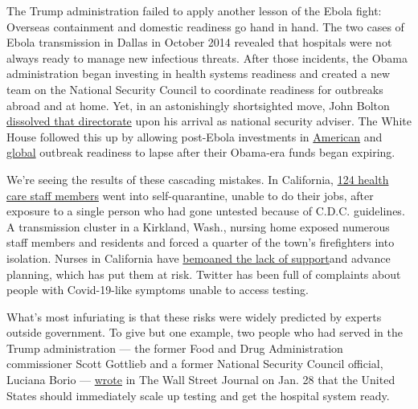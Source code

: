 The Trump administration failed to apply another lesson of the Ebola
fight: Overseas containment and domestic readiness go hand in hand. The
two cases of Ebola transmission in Dallas in October 2014 revealed that
hospitals were not always ready to manage new infectious threats. After
those incidents, the Obama administration began investing in health
systems readiness and created a new team on the National Security
Council to coordinate readiness for outbreaks abroad and at home. Yet,
in an astonishingly shortsighted move, John Bolton
\href{https://www.washingtonpost.com/news/to-your-health/wp/2018/05/10/top-white-house-official-in-charge-of-pandemic-response-exits-abruptly/}{dissolved
that directorate} upon his arrival as national security adviser. The
White House followed this up by allowing post-Ebola investments in
\href{https://www.washingtonpost.com/opinions/a-program-protecting-us-from-deadly-pandemic-is-about-to-expire/2019/12/27/7c216c26-2280-11ea-bed5-880264cc91a9_story.html}{American}
and
\href{https://www.washingtonpost.com/news/to-your-health/wp/2018/02/01/cdc-to-cut-by-80-percent-efforts-to-prevent-global-disease-outbreak/}{global}
outbreak readiness to lapse after their Obama-era funds began expiring.

We're seeing the results of these cascading mistakes. In California,
\href{https://www.cnn.com/2020/02/29/health/uc-davis-health-care-workers-self-quarantine/index.html}{124
health care staff members} went into self-quarantine, unable to do their
jobs, after exposure to a single person who had gone untested because of
C.D.C. guidelines. A transmission cluster in a Kirkland, Wash., nursing
home exposed numerous staff members and residents and forced a quarter
of the town's firefighters into isolation. Nurses in California have
\href{https://www.nytimes3xbfgragh.onion/2020/03/05/us/coronavirus-nurses.html}{bemoaned
the lack of support}and advance planning, which has put them at risk.
Twitter has been full of complaints about people with Covid-19-like
symptoms unable to access testing.

What's most infuriating is that these risks were widely predicted by
experts outside government. To give but one example, two people who had
served in the Trump administration --- the former Food and Drug
Administration commissioner Scott Gottlieb and a former National
Security Council official, Luciana Borio ---
\href{https://www.wsj.com/articles/act-now-to-prevent-an-american-epidemic-11580255335}{wrote}
in The Wall Street Journal on Jan. 28 that the United States should
immediately scale up testing and get the hospital system ready.


